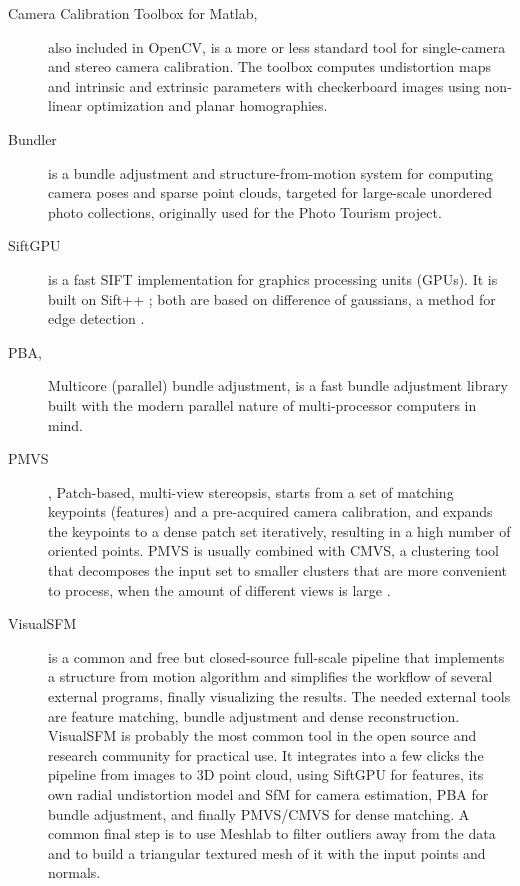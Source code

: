 \begin{description}
	\item[Camera Calibration Toolbox for Matlab,] \cite{camcalmatlab} also included in OpenCV, is a more or less standard tool for single-camera and stereo camera calibration.
		The toolbox computes undistortion maps and intrinsic and extrinsic parameters with checkerboard images using non-linear optimization and planar homographies.

	\item[Bundler] \cite{snavely2006photo} is a bundle adjustment and structure-from-motion system for computing camera poses and sparse point clouds, targeted for large-scale unordered photo collections, originally used for the Photo Tourism project.

	\item[SiftGPU] \cite{changchang2007siftgpu} is a fast SIFT implementation for graphics processing units (GPUs).
		It is built on Sift++ \cite{vedaldi2011sift++}; both are based on difference of gaussians, a method for edge detection \cite{marr1980theory}.

	\item[PBA,] \cite{wu2011multicore} Multicore (parallel) bundle adjustment, is a fast bundle adjustment library built with the modern parallel nature of multi-processor computers in mind.

	\item[PMVS], Patch-based, multi-view stereopsis, starts from a set of matching keypoints (features) and a pre-acquired camera calibration, and expands the keypoints to a dense patch set iteratively, resulting in a high number of oriented points.
		PMVS is usually combined with CMVS, a clustering tool that decomposes the input set to smaller clusters that are more convenient to process, when the amount of different views is large \cite{furukawa2010accurate,furukawa2012patch}.

	\item[VisualSFM] \cite{wu2013towards} is a common and free but closed-source full-scale pipeline that implements a structure from motion algorithm and simplifies the workflow of several external programs, finally visualizing the results.
		The needed external tools are feature matching, bundle adjustment and dense reconstruction.
		VisualSFM is probably the most common tool in the open source and research community for practical use.
		It integrates into a few clicks the pipeline from images to 3D point cloud, using SiftGPU for features, its own radial undistortion model and SfM for camera estimation, PBA for bundle adjustment, and finally PMVS/CMVS for dense matching.
		A common final step is to use Meshlab to filter outliers away from the data and to build a triangular textured mesh of it with the input points and normals.


\end{description}
